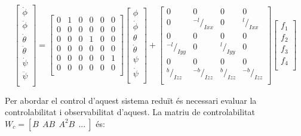 \documentclass[twoside]{article}
\begin{document}
\begin{center}
\begin{equation}
\left[ \begin{array}{c}
\dot{\phi} \\
\ddot{\phi} \\
\dot{\theta} \\
\ddot{\theta} \\
\dot{\psi} \\
\ddot{\psi} \\ \end{array} \right] = \left[ \begin{array}{cccccc}
0 & 1 & 0 & 0 & 0 & 0 \\
0 & 0 & 0 & 0 & 0 & 0 \\
0 & 0 & 0 & 1 & 0 & 0 \\
0 & 0 & 0 & 0 & 0 & 0 \\
0 & 0 & 0 & 0 & 0 & 1 \\
0 & 0 & 0 & 0 & 0 & 0 \\ \end{array} \right] \left[ \begin{array}{c}
\phi \\
\dot{\phi} \\
\theta \\
\dot{\theta} \\
\psi \\
\dot{\psi} \\ 
\end{array} \right] + \left[ \begin{array}{cccc}
0 & 0 & 0 & 0 \\
0 & {}^{-l}/_{Ixx} & 0 & {}^{l}/_{Ixx} \\ 
0 & 0 & 0 & 0 \\
{}^{-l}/_{Iyy} & 0 & {}^{l}/_{Iyy} & 0 \\
0 & 0 & 0 & 0 \\
{}^{b}/_{Izz} & {}^{-b}/_{Izz} & {}^{b}/_{Izz} & {}^{-b}/_{Izz} \\ \end{array} \right] \left[ \begin{array}{c}
f_{1} \\
f_{2} \\
f_{3} \\
f_{4} \\ \end{array} \right]
\end{equation} 
\end{center}

Per abordar el control d'aquest sistema reduït és necessari evaluar la controlabilitat i observabilitat d'aquest. La matriu de controlabilitat $W_c=[B \>\> AB \>\> A^{2}B \>\> ... \>]$ és:
\begin{equation}
\end{equation}
\end{document}
